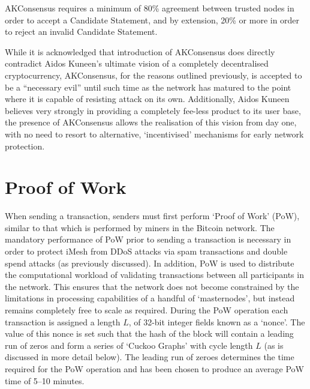 \documentclass[a4paper,10pt,twocolumn]{article}
\begin{document}
AKConsensus requires a minimum of 80\% agreement between trusted nodes in order to accept a Candidate Statement, and by extension, 
20\% or more in order to reject an invalid Candidate Statement.

While it is acknowledged that introduction of AKConsensus does directly contradict Aidos Kuneen's ultimate 
vision of a completely decentralised cryptocurrency, AKConsensus, for the reasons outlined previously, is accepted to be a
``necessary evil'' until such time as the network has matured to the point where it is capable of resisting attack on its own. 
Additionally, Aidos Kuneen believes very strongly in providing a completely fee-less product to its user base,
the presence of AKConsensus allows the realisation of this vision from day one, with no need to resort to alternative, `incentivised' 
mechanisms for early network protection.

\section{Proof of Work}
\label{sec:PoW}

When sending a transaction, senders must first perform `Proof of Work' (PoW), similar to that which is performed by miners in the 
Bitcoin network. The mandatory performance of PoW prior to sending a transaction is necessary in order to protect iMesh from DDoS 
attacks via spam transactions and double spend attacks (as previously discussed). In addition, PoW is used to distribute the 
computational workload of validating transactions between all participants in the network. This ensures that the network does not 
become constrained by the limitations in processing capabilities of a handful of `masternodes', but instead remains completely free to 
scale as required. During the PoW operation each transaction is assigned a length \(L\), of 32-bit integer fields known as a `nonce'. 
The value of this nonce is set such that the hash of the block will contain a leading run of zeros and form a series of `Cuckoo Graphs' with cycle length \(L\) (as is discussed in more detail below). The leading run of zeroes determines the time required for the PoW operation and has been chosen to produce an 
average PoW time of 5--10 minutes.
\end{document}
